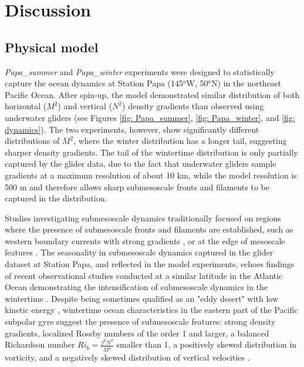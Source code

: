 \documentclass[draft,linenumbers]{agujournal2018}
\begin{document}
\section{Discussion}
\label{sec: Discussion}

\subsection{Physical model}
\label{sec: Discussion_model}
\textit{Papa\_summer} and \textit{Papa\_winter} experiments were designed to statistically capture the ocean dynamics at Station Papa (145$^o$W, 50$^o$N) in the northeast Pacific Ocean. After spin-up, the model demonstrated similar distribution of both horizontal ($M^2$) and vertical ($N^2$) density gradients than observed using underwater gliders (see Figures \ref{fig: Papa_summer}, \ref{fig: Papa_winter}, and \ref{fig: dynamics}). The two experiments, however, show significantly different distributions of $M^2$, where the winter distribution has a longer tail, suggesting sharper density gradients. The tail of the wintertime distribution is only partially captured by the glider data, due to the fact that underwater gliders sample gradients at a maximum resolution of about 10 km, while the model resolution is 500 m and therefore allows sharp submesoscale fronts and filaments to be captured in the distribution.

Studies investigating submesoscale dynamics traditionally focused on regions where the presence of submesoscale fronts and filaments are established, such as western boundary currents with strong gradients \citep{Dasaro_2011, Thomas_2013}, or at the edge of mesoscale features \citep{vanHaren_2006,Waite_2016}. The seasonality in submesoscale dynamics captured in the glider dataset at Station Papa, and reflected in the model experiments, echoes findings of recent observational studies conducted at a similar latitude in the Atlantic Ocean demonstrating the intensification of submesoscale dynamics in the wintertime \citep{Thompson_2016, Buckingham_2016}. Despite being sometimes qualified as an "eddy desert" with low kinetic energy \citep{Chelton_2011}, wintertime ocean characteristics in the eastern part of the Pacific subpolar gyre suggest the presence of submesoscale features: strong density gradients, localized Rossby numbers of the order 1 and larger, a balanced Richardson number $Ri_b = \frac{f^2N^2}{M^4}$ smaller than 1, a positively skewed distribution in vorticity, and a negatively skewed distribution of vertical velocities \citep[see Figure \ref{fig: dynamics};][]{Thomas_2008,Rudnick_2001, Buckingham_2016}.
\end{document}
